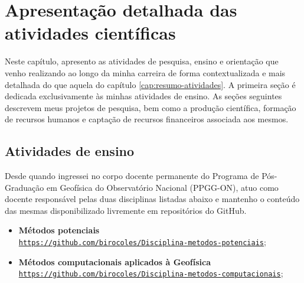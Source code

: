 \renewcommand{\chaptername}{Capítulo}
\chapter{Apresentação detalhada das atividades científicas}
\renewcommand{\chaptername}{Apresentação detalhada das atividades científicas}
\label{cap:detalhe-atividades}

Neste capítulo, apresento as atividades de pesquisa, ensino e orientação que venho
realizando ao longo da minha carreira de forma contextualizada e mais detalhada 
do que aquela do capítulo \ref{cap:resumo-atividades}. 
A primeira seção é dedicada exclusivamente às minhas atividades de ensino.
As seções seguintes descrevem meus projetos de pesquisa, bem como a produção científica,
formação de recursos humanos e captação de recursos financeiros associada aos mesmos.


\section{Atividades de ensino}
\label{sec:ensino}

Desde quando ingressei no corpo docente permanente do Programa de Pós-Graduação em 
Geofísica do Observatório Nacional (PPGG-ON), atuo como docente responsável pelas
duas disciplinas listadas abaixo e mantenho o conteúdo das mesmas disponibilizado 
livremente em repositórios do GitHub.

\begin{itemize}
	\item[\parbox{0.03\textwidth}{\vspace{-0.1\baselineskip}\faChalkboardTeacher}]
	{\textbf{Métodos potenciais}\\ 
	\href{https://github.com/birocoles/Disciplina-metodos-potenciais}
	{\texttt{https://github.com/birocoles/Disciplina-metodos-potenciais}}};
	
	\item[\parbox{0.03\textwidth}{\vspace{-0.1\baselineskip}\faChalkboardTeacher}]
	{\textbf{Métodos computacionais aplicados à Geofísica}\newline
	\href{https://github.com/birocoles/Disciplina-metodos-computacionais}
	{\texttt{https://github.com/birocoles/Disciplina-metodos-computacionais}}};
\end{itemize}


